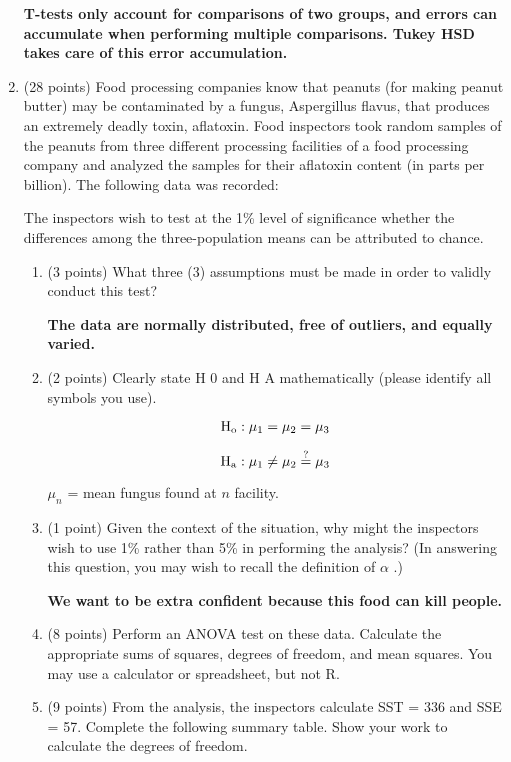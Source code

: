 \documentclass{article}
\begin{document}
\begin{enumerate}
	\textbf{T-tests only account for comparisons of two groups, and errors can accumulate when performing multiple comparisons. Tukey HSD takes care of this error accumulation.}
	
	\item (28 points) Food processing companies know that peanuts (for making peanut butter) may be contaminated by a fungus, Aspergillus flavus, that produces an extremely deadly toxin, aflatoxin. Food inspectors took random samples of the peanuts from three different processing facilities of a food processing company and analyzed the samples for their aflatoxin content (in parts per billion). The following data was recorded:

	The inspectors wish to test at the 1\% level of significance whether the differences among the three-population means can be attributed to chance.
	
	\begin{enumerate}
		\item (3 points) What three (3) assumptions must be made in order to validly conduct this test?

		\textbf{The data are normally distributed, free of outliers, and equally varied.} \\
		
		\item (2 points) Clearly state H 0 and H A mathematically (please identify all symbols you use).
		
		\[
		{\rm H_o}: \mu_1 = \mu_2 = \mu_3
		\]
		
		\[
		{\rm H_a}: \mu_1 \neq \mu_2 \stackrel{?}{=} \mu_3
		\]
		
		$\mu_n$ = mean fungus found at $n$ facility. \\
		
		\item (1 point) Given the context of the situation, why might the inspectors wish to use 1\% rather than 5\% in performing the analysis? (In answering this question, you may wish to recall the definition of $\alpha$ .)
		
		\textbf{We want to be extra confident because this food can kill people.} \\
		
		\item (8 points) Perform an ANOVA test on these data. Calculate the appropriate sums of squares, degrees of freedom, and mean squares. You may use a calculator or spreadsheet, but not R.
		
		\item (9 points) From the analysis, the inspectors calculate SST = 336 and SSE = 57. Complete the following summary table. Show your work to calculate the degrees of freedom.
	

\end{enumerate}
\end{enumerate}
\end{document}
